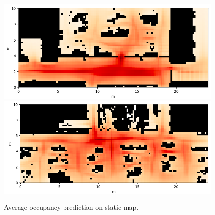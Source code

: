 \begin{figure}[ht]
  \centering
    \includegraphics[width=\textwidth]{figures/average_occupancy_3.png} \\
    \includegraphics[width=\textwidth]{figures/average_occupancy_4.png} \\
    \caption[Average occupancy prediction on static map]{Average occupancy prediction on static map.} 
    \label{fig:average_occupancy_pred}
\end{figure}


 